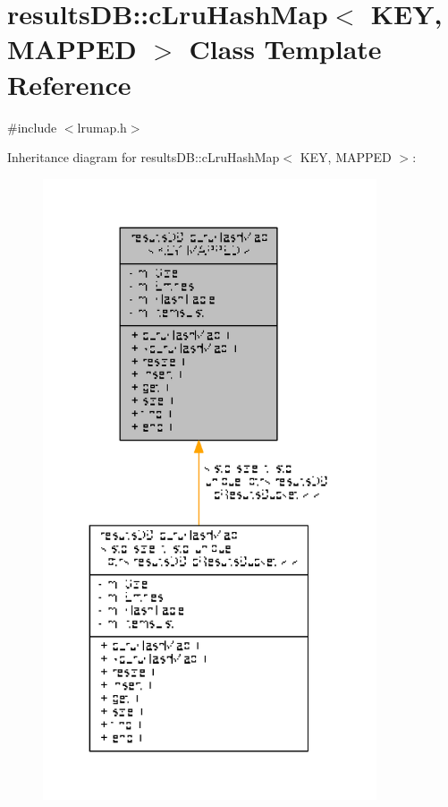 \hypertarget{classresultsDB_1_1cLruHashMap}{\section{results\-D\-B\-:\-:c\-Lru\-Hash\-Map$<$ K\-E\-Y, M\-A\-P\-P\-E\-D $>$ Class Template Reference}
\label{classresultsDB_1_1cLruHashMap}
}


{\ttfamily \#include $<$lrumap.\-h$>$}



Inheritance diagram for results\-D\-B\-:\-:c\-Lru\-Hash\-Map$<$ K\-E\-Y, M\-A\-P\-P\-E\-D $>$\-:
\nopagebreak
\begin{figure}[H]
\begin{center}
\leavevmode
\includegraphics[width=280pt]{classresultsDB_1_1cLruHashMap__inherit__graph}
\end{center}
\end{figure}


